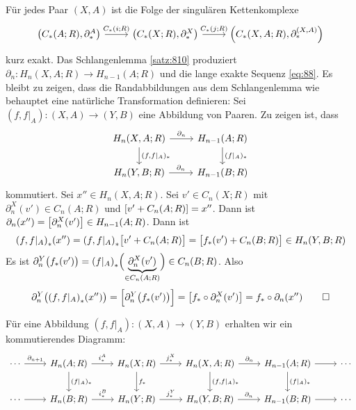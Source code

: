 \begin{beweis}[name={von \autoref{satz:86}},label=bew:86]
	Für jedes Paar $(X,A)$ ist die Folge  der singulären Kettenkomplexe
	\[
		\begin{tikzcd}
			\enbrace*{C_*(A;R), \partial_*^A} \rar["C_*(i;R)"] &  \enbrace*{C_*(X;R), \partial_*^X} \rar["C_*(j;R)"] & \enbrace*{C_*(X,A;R), \partial_*^{(X,A)}}
		\end{tikzcd}
	\]
	kurz exakt. Das Schlangenlemma {\ref{satz:810}} produziert $\partial_n \colon H_n(X,A;R) \to H_{n-1}(A;R)$ und die lange exakte Sequenz \eqref{eq:88}.
	Es bleibt zu zeigen, dass die Randabbildungen aus dem Schlangenlemma wie behauptet eine natürliche Transformation definieren: Sei $(f,f|_{A}) \colon (X,A) \to (Y,B)$ eine
	Abbildung von Paaren. Zu zeigen ist, dass
	\[
		\begin{tikzcd}
			H_n(X,A;R) \rar["\partial_n"]  \dar["{(f,f|_A)_*}"]& H_{n-1}(A;R) \dar["{(f|_{A})_*}"] \\
			H_n(Y,B;R) \rar["\partial_n"] & H_{n-1}(B;R)
		\end{tikzcd}
	\]
	kommutiert. Sei $x'' \in H_n(X,A;R)$. Sei $v' \in C_n(X;R)$ mit $\partial_n^X(v') \in C_n(A;R)$ und $\benbrace*{v' + C_n(A;R)}= x''$. Dann ist 
	$\partial_n(x'')= \benbrace*{\partial_n^X(v')} \in H_{n-1}(A;R)$. Dann ist 
	\[
		\enbrace*{f,f|_A}_*(x'') =  \enbrace*{f,f|_A}_* \benbrace[\big]{v' + C_n(A;R)}  = \benbrace[\big]{f_*(v')+ C_n(B;R)} \in H_n(Y,B;R) 
	\]
	Es ist 
	\(
		\partial_n^Y \enbrace[\big]{f_*(v')} = \enbrace*{f|_A}_* \enbrace[\Big]{\underbrace{\partial_n^X(v')}_{\in C_n(A;R)}} \in C_n(B;R)   
	\).
	Also
	\begin{align*}
		\partial_n^Y \enbrace[\big]{\enbrace*{f,f|_A}_*(x'') } = \benbrace[\Big]{\partial_n^Y \enbrace[\big]{f_*(v')} } = \benbrace*{f_* \circ \partial_n^X(v')} = f_* \circ 
		\partial_n(x'') \qedhere  
	\end{align*}
\end{beweis}

\begin{bemerkung}
	Für eine Abbildung $(f,f|_A) \colon (X,A) \to (Y,B)$ erhalten wir ein kommutierendes Diagramm:
	\[
		\begin{tikzcd}[row sep=2.2em]
			\cdots \rar["\partial_{n+1}"] & H_n(A;R) \rar["i^A_*"] \dar["(f|_A)_*"] & H_n(X;R) \rar["j^X_*"] \dar["f_*"]& H_n(X,A;R) \rar["\partial_n"] \dar["{(f,f|_A)_*}"]  
			& H_{n-1}(A;R) \rar \dar["(f|_A)_*"] & \cdots \\
			\cdots \rar & H_n(B;R) \rar["i^B_*"] & H_n(Y;R) \rar["j^Y_*"] & H_n(Y,B;R) \rar["\partial_n"] & H_{n-1}(B;R) \rar & \cdots
		\end{tikzcd}
	\]
\end{bemerkung}

